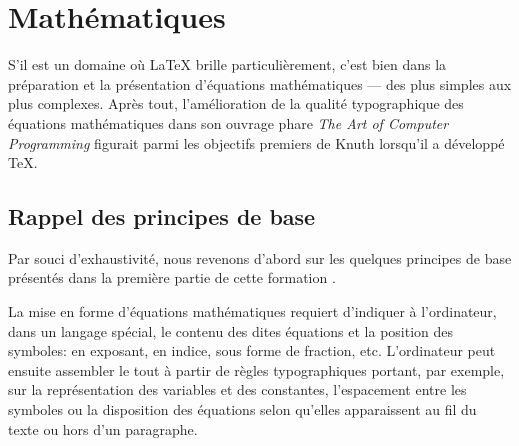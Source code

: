 \chapter{Mathématiques}
\label{chap:math}


S'il est un domaine où {\LaTeX} brille particulièrement, c'est bien
dans la préparation et la présentation d'équations mathématiques ---
des plus simples aux plus complexes. Après tout, l'amélioration de la
qualité typographique des équations mathématiques dans son ouvrage
phare \emph{The Art of Computer Programming} figurait parmi les
objectifs premiers de Knuth lorsqu'il a développé {\TeX}.


\section{Rappel des principes de base}
\label{sec:math:rappel}

Par souci d'exhaustivité, nous revenons d'abord sur les quelques
principes de base présentés dans la première partie de cette formation
\citep[section~7]{UL:latex:1}.

La mise en forme d'équations mathématiques requiert d'indiquer à
l'ordinateur, dans un langage spécial, le contenu des dites équations
et la position des symboles: en exposant, en indice, sous forme de
fraction, etc. L'ordinateur peut ensuite assembler le tout à partir de
règles typographiques portant, par exemple, sur la représentation des
variables et des constantes, l'espacement entre les symboles ou la
disposition des équations selon qu'elles apparaissent au fil du texte
ou hors d'un paragraphe.

